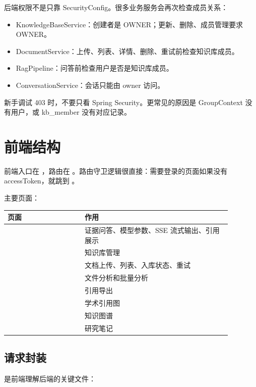 \documentclass[UTF8,zihao=-4]{ctexart}
\begin{document}
后端权限不是只靠 SecurityConfig。很多业务服务会再次检查成员关系：

\begin{itemize}
  \item KnowledgeBaseService：创建者是 OWNER；更新、删除、成员管理要求 OWNER。
  \item DocumentService：上传、列表、详情、删除、重试前检查知识库成员。
  \item RagPipeline：问答前检查用户是否是知识库成员。
  \item ConversationService：会话只能由 owner 访问。
\end{itemize}

新手调试 403 时，不要只看 Spring Security。更常见的原因是 GroupContext 没有用户，或 kb\_member 没有对应记录。

\section{前端结构}

前端入口在 ，路由在 。路由守卫逻辑很直接：需要登录的页面如果没有 accessToken，就跳到 。

主要页面：

\begin{longtable}{L{0.30\linewidth}L{0.58\linewidth}}
\toprule
页面 & 作用 \\
\midrule
{} & 证据问答、模型参数、SSE 流式输出、引用展示 \\
 & 知识库管理 \\
 & 文档上传、列表、入库状态、重试 \\
 & 文件分析和批量分析 \\
 & 引用导出 \\
 & 学术引用图 \\
 & 知识图谱 \\
 & 研究笔记 \\
\bottomrule
\end{longtable}

\subsection{请求封装}

 是前端理解后端的关键文件：
\end{document}
